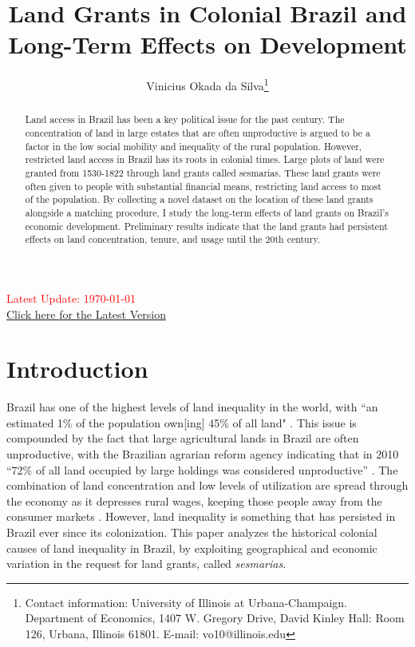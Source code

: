 \documentclass{article}
\title{Land Grants in Colonial Brazil and Long-Term Effects on Development}
\author{Vinicius Okada da Silva\thanks{Contact information: University of Illinois at Urbana-Champaign. Department of Economics, 1407 W. Gregory Drive, David Kinley Hall: Room 126, Urbana, Illinois 61801. E-mail: vo10@illinois.edu}}
\affil{Department of Economics, University of Illinois at Urbana-Champaign}
\date{}
\begin{document}
\maketitle
\thispagestyle{empty} 

\vspace{-.1cm}
\begin{center}
  \textcolor{red}{Latest Update: \today}
  \\
  \href{https://viniokadasilva.github.io/Papers/Sesmarias/02.Draft/02.Second_Draft/Sesmarias_Paper.pdf}{Click here for the Latest Version}
\end{center}
\vspace{.1cm}

\begin{abstract}
  Land access in Brazil has been a key political issue for the past century. The concentration of land in large estates that are often unproductive is argued to be a factor in the low social mobility and inequality of the rural population. However, restricted land access in Brazil has its roots in colonial times. Large plots of land were granted from 1530-1822 through land grants called sesmarias. These land grants were often given to people with substantial financial means, restricting land access to most of the population. By collecting a novel dataset on the location of these land grants alongside a matching procedure, I study the long-term effects of land grants on Brazil's economic development. Preliminary results indicate that the land grants had persistent effects on land concentration, tenure, and usage until the 20th century.
\end{abstract}

\clearpage
{} 

\section{Introduction}

Brazil has one of the highest levels of land inequality in the world, with ``an estimated 1\% of the population own[ing] 45\% of all land" \parencite{Usaid2016-xs}. 
This issue is compounded by the fact that large agricultural lands in Brazil are often unproductive, with the Brazilian agrarian reform agency indicating that in 2010 ``72\% of all land occupied by large holdings was considered unproductive'' \parencite{Carlson2019-mk}.
The combination of land concentration and low levels of utilization are spread through the economy as it depresses rural wages, keeping those people away from the consumer markets \parencite[p.~1]{De_Oliveira_Andrade1980-xz}.
However, land inequality is something that has persisted in Brazil ever since its colonization.
This paper analyzes the historical colonial causes of land inequality in Brazil, by exploiting geographical and economic variation in the request for land grants, called \textit{sesmarias}.
\end{document}
